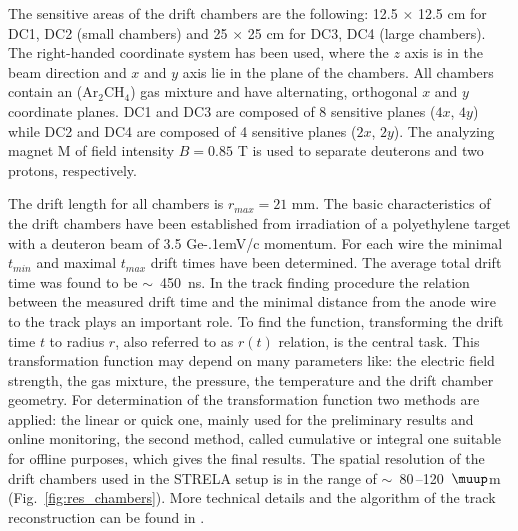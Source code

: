 \documentclass[twocolumn,epjc3]{svjour3}
\newcommand{\GeVc}   {Ge\kern-.1emV/c\xspace}
\begin{document}
The sensitive areas of the drift chambers are the following: 12.5 $\times$ 12.5
cm for DC1, DC2 (small chambers) and 25 $\times$ 25 cm for DC3, DC4 (large
chambers). The right-handed coordinate system has been used, where the $z$ axis
is in the beam direction and $x$ and $y$ axis lie in the plane of the
chambers. All chambers contain an (Ar$_2$CH$_4$) gas mixture and have
alternating, orthogonal $x$ and $y$ coordinate planes. DC1 and DC3 are composed
of 8 sensitive planes ($4x$, $4y$) while DC2 and DC4 are composed of 4 sensitive
planes ($2x$, $2y$). The analyzing magnet M of field intensity $B = 0.85$ T is
used to separate deuterons and two protons, respectively.

The drift length for all chambers is $r_{max} = 21$ mm. The basic
characteristics of the drift chambers have been established from irradiation of
a polyethylene target with a deuteron beam of 3.5 \GeVc momentum. For each wire
the minimal $t_{min}$ and maximal $t_{max}$ drift times have been
determined. The average total drift time was found to be $\sim$~450~ns. In the
track finding procedure the relation between the measured drift time and the
minimal distance from the anode wire to the track plays an important role. To
find the function, transforming the drift time $t$ to radius $r$, also referred
to as $r(t)$ relation, is the central task. This transformation function may
depend on many parameters like: the electric field strength, the gas mixture,
the pressure, the temperature and the drift chamber geometry. For determination
of the transformation function two methods are applied: the linear or quick one,
mainly used for the preliminary results and online monitoring, the second
method, called cumulative or integral one suitable for offline purposes, which
gives the final results. The spatial resolution of the drift chambers used in
the STRELA setup is in the range of $\sim$~80\,--120~$\muup$m
(Fig.~\ref{fig:res_chambers}). More technical details and the algorithm of the
track reconstruction can be found in \cite{gla13}.
\end{document}
